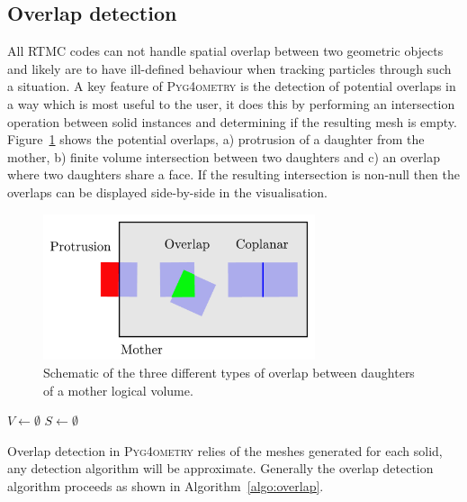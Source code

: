 \documentclass[final,5p,times,twocolumn]{elsarticle}
\newcommand{\PYGEOMETRY}{\textsc{Pyg4ometry}}
\begin{document}
\subsection{Overlap detection}
All RTMC codes can not handle spatial overlap between two geometric objects and likely are to have ill-defined behaviour when tracking particles  
through such a situation.  A key feature of \PYGEOMETRY{} is the detection of potential overlaps in a way which is most useful to the user, it does this by performing an intersection operation between solid instances and determining if the resulting mesh is empty. Figure~\ref{fig:overlap} shows the potential overlaps, a) protrusion of a daughter from the mother, b)  finite volume intersection between two daughters  and c) an overlap where two daughters share a face. If the resulting intersection 
is non-null then the overlaps can be displayed side-by-side in the visualisation. 
\begin{figure}[htbp]
\begin{center}
\includegraphics[width=8cm]{./diagrams/overlap.pdf}
\caption{Schematic of the three different types of overlap between daughters of a mother logical volume.}
\label{fig:overlap}
\end{center}
\end{figure} 

\begin{algorithm}[h]
  \SetAlgoLined
$V \longleftarrow \emptyset$\;
$S \longleftarrow \emptyset$\;
\label{algo:overlap}
\caption{The overlap checking algorithm employed in \PYGEOMETRY{}.}
\end{algorithm}

Overlap detection in \PYGEOMETRY{} relies of the meshes generated for each solid, 
any detection algorithm will be approximate. Generally the overlap detection 
algorithm proceeds as shown in Algorithm~\ref{algo:overlap}.
\end{document}
